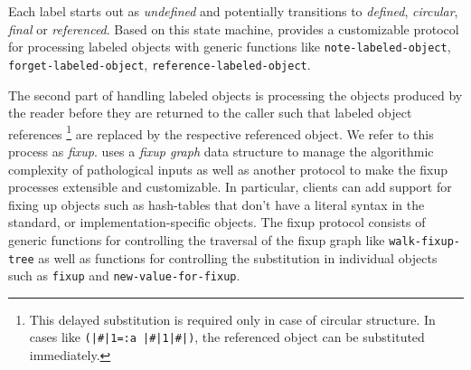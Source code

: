 Each label starts out as \emph{undefined} and potentially transitions
to \emph{defined}, \emph{circular}, \emph{final} or \emph{referenced}.
Based on this state machine, \eclector{} provides a customizable
protocol for processing labeled objects with generic functions like
\texttt{note-labeled-object}, \texttt{forget-labeled-object},
\texttt{reference-labeled-object}.

The second part of handling labeled objects is processing the objects
produced by the reader before they are returned to the caller such
that labeled object references%
\footnote{This delayed substitution is required only in case of
  circular structure.  In cases like
  \texttt{(|\#|1=:a |\#|1|\#|)}, the
  referenced object can be substituted immediately.}  are replaced by
the respective referenced object.  We refer to this process as
\emph{fixup}.  \eclector{} uses a \emph{fixup graph} data structure to
manage the algorithmic complexity of pathological inputs
 as well as another protocol to make
the fixup processes extensible and customizable.  In particular,
clients can add support for fixing up objects such as hash-tables that
don't have a literal syntax in the standard, or
implementation-specific objects.  The fixup protocol consists of
generic functions for controlling the traversal of the fixup graph
like \texttt{walk-fixup-tree} as well as functions for controlling the
substitution in individual objects such as \texttt{fixup} and
\texttt{new-value-for-fixup}.


